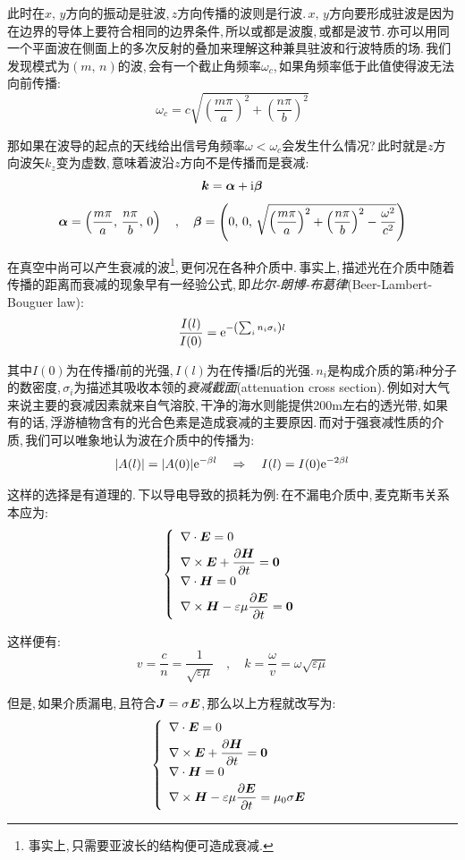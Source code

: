 此时在$x,\,y$方向的振动是驻波,\,$z$方向传播的波则是行波.\,$x,\,y$方向要形成驻波是因为在边界的导体上要符合相同的边界条件,\,所以或都是波腹,\,或都是波节.\,亦可以用同一个平面波在侧面上的多次反射的叠加来理解这种兼具驻波和行波特质的场.\,我们发现模式为$(m,\,n)$的波,\,会有一个截止角频率$\omega_c$,\,如果角频率低于此值使得波无法向前传播:
\[\omega_c=c\sqrt{\left(\frac{m\pi}{a}\right)^2+\left(\frac{n\pi}{b}\right)^2}\]

那如果在波导的起点的天线给出信号角频率$\omega<\omega_c$会发生什么情况?\,此时就是$z$方向波矢$k_z$变为虚数,\,意味着波沿$z$方向不是传播而是衰减:
\[\boldsymbol{k}=\boldsymbol{\alpha}+{\rm i}\boldsymbol{\beta}\]
\[\boldsymbol{\alpha}=\left( \frac{m\pi}{a},\, \frac{n\pi}{b},\, 0\right)\quad,\quad\boldsymbol{\beta}=\left(0 ,\,0 ,\, \sqrt{\left(\frac{m\pi}{a}\right)^2+\left(\frac{n\pi}{b}\right)^2-\frac{\omega^2}{c^2}}\right)\]

在真空中尚可以产生衰减的波\footnote{事实上,\,只需要亚波长的结构便可造成衰减.},\,更何况在各种介质中.\,事实上,\,描述光在介质中随着传播的距离而衰减的现象早有一经验公式,\,即\emph{比尔-朗博-布葛律}(Beer-Lambert-Bouguer law):
\[\frac{I(l)}{I(0)}={\rm e}^{-\left(\sum_{i} n_i\sigma_i\right) l}\]

其中$I(0)$为在传播$l$前的光强,\,$I(l)$为在传播$l$后的光强.\,$n_i$是构成介质的第$i$种分子的数密度,\,$\sigma_i$为描述其吸收本领的\emph{衰减截面}(attenuation cross section).\,例如对大气来说主要的衰减因素就来自气溶胶,\,干净的海水则能提供200m左右的透光带,\,如果有的话,\,浮游植物含有的光合色素是造成衰减的主要原因.\,而对于强衰减性质的介质,\,我们可以唯象地认为波在介质中的传播为:
\[|A(l)|=|A(0)|{\rm e}^{-\beta l}\quad \Rightarrow\quad I(l)=I(0){\rm e}^{-2\beta l}\]

这样的选择是有道理的.\,下以导电导致的损耗为例:\,在不漏电介质中,\,麦克斯韦关系本应为:
\[\left\{ \begin{array}{l} 
\nabla\cdot \boldsymbol{E}=0 \\[3pt] 
\nabla\times \boldsymbol{E}+\dfrac{\partial \boldsymbol{H}}{\partial t}=\boldsymbol{0} \\[3pt]
\nabla\cdot \boldsymbol{H}=0 \\[3pt]
\nabla\times \boldsymbol{H}-\varepsilon\mu\dfrac{\partial \boldsymbol{E}}{\partial t}=\boldsymbol{0} \end{array}\right.\]

这样便有:
\[v=\frac{c}{n}=\frac{1}{\sqrt{\varepsilon \mu}}\quad ,\quad k=\frac{\omega}{v}=\omega\sqrt{\varepsilon \mu}\]

但是,\,如果介质漏电,\,且符合$\boldsymbol{J}=\sigma \boldsymbol{E}$,\,那么以上方程就改写为:
\[\left\{ \begin{array}{l} 
\nabla\cdot \boldsymbol{E}=0 \\[3pt] 
\nabla\times \boldsymbol{E}+\dfrac{\partial \boldsymbol{H}}{\partial t}=\boldsymbol{0} \\[3pt]
\nabla\cdot \boldsymbol{H}=0 \\[3pt]
\nabla\times \boldsymbol{H}-\varepsilon\mu\dfrac{\partial \boldsymbol{E}}{\partial t}=\mu_0 \sigma \boldsymbol{E} \end{array}\right.\]

